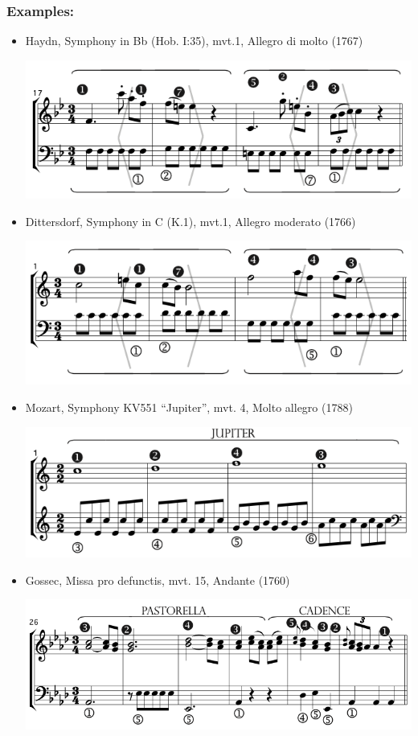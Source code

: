 \documentclass[11pt, openany]{article}
\begin{document}
\subsubsection{Examples:}
\begin{itemize}
\item Haydn, Symphony in Bb (Hob. I:35), mvt.1, Allegro di molto (1767)
\begin{center}
\includegraphics[scale=0.5]{haydn35.png}
\end{center}
\item Dittersdorf, Symphony in C (K.1), mvt.1, Allegro moderato (1766)
\begin{center}
\includegraphics[scale=0.5]{dittersdorf1.png}
\end{center}
\item Mozart, Symphony KV551 “Jupiter”, mvt. 4, Molto allegro (1788)
\begin{center}
\includegraphics[scale=0.5]{mozart551.png}
\end{center}
\item Gossec, Missa pro defunctis, mvt. 15, Andante (1760)
\begin{center}
\includegraphics[scale=0.5]{gossecmpd.png}
\end{center}
\end{itemize}
\end{document}
